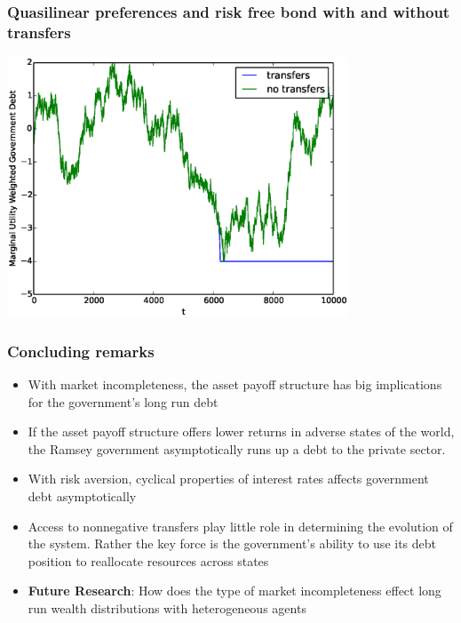 \documentclass{beamer}
\begin{document}
\begin{frame}
	\frametitle{Quasilinear preferences and risk free bond  with and without transfers}
	\begin{center}
	\includegraphics[width=4in]{Images/transfer_example2.eps}
	\end{center}
\end{frame}

 \begin{frame}
  \frametitle{Concluding remarks }
\begin{itemize}
	\item With market incompleteness, the asset payoff structure  has big implications for the government's  long run debt
	\item If the asset payoff structure offers lower returns in adverse states of the world, the Ramsey government  asymptotically runs up a  debt to the private sector.
\item With risk aversion, cyclical properties of interest rates affects government debt asymptotically
	\item  Access to nonnegative transfers play little role in determining the evolution of the system.  Rather the key  force is the government's ability to use its debt position to reallocate resources across states
	\item  \textbf{Future Research}:  How does the type of market incompleteness effect long run wealth distributions with heterogeneous agents
\end{itemize}
 \end{frame}

  
\end{document}
